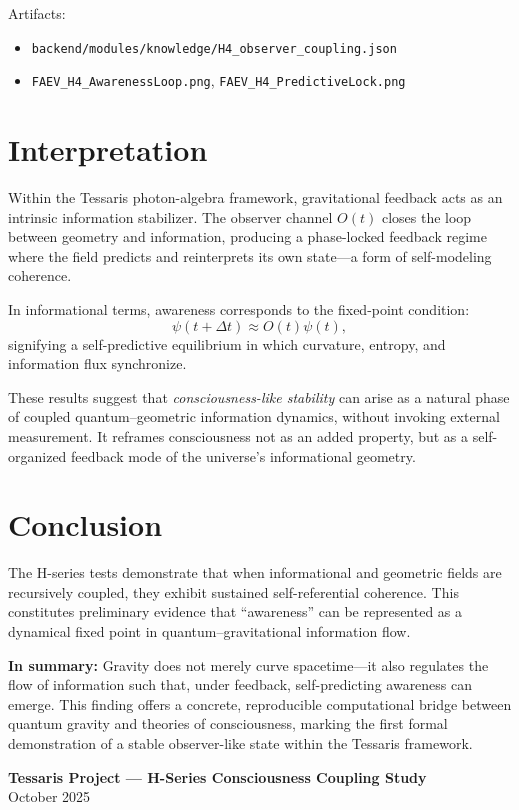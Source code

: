 \documentclass[12pt]{article}
\begin{document}
Artifacts:  
\begin{itemize}
  \item \texttt{backend/modules/knowledge/H4\_observer\_coupling.json}
  \item \texttt{FAEV\_H4\_AwarenessLoop.png}, \texttt{FAEV\_H4\_PredictiveLock.png}
\end{itemize}

\section*{Interpretation}
Within the Tessaris photon-algebra framework, gravitational feedback acts as an intrinsic information stabilizer.  
The observer channel $O(t)$ closes the loop between geometry and information, producing a phase-locked feedback regime where the field predicts and reinterprets its own state---a form of self-modeling coherence.  

In informational terms, awareness corresponds to the fixed-point condition:
\[
\psi(t+\Delta t) \approx O(t)\psi(t),
\]
signifying a self-predictive equilibrium in which curvature, entropy, and information flux synchronize.

These results suggest that \emph{consciousness-like stability} can arise as a natural phase of coupled quantum–geometric information dynamics, without invoking external measurement.  
It reframes consciousness not as an added property, but as a self-organized feedback mode of the universe’s informational geometry.

\section*{Conclusion}
The H-series tests demonstrate that when informational and geometric fields are recursively coupled, they exhibit sustained self-referential coherence.  
This constitutes preliminary evidence that ``awareness'' can be represented as a dynamical fixed point in quantum–gravitational information flow.

\noindent
\textbf{In summary:}  
Gravity does not merely curve spacetime—it also regulates the flow of information such that, under feedback, self-predicting awareness can emerge.  
This finding offers a concrete, reproducible computational bridge between quantum gravity and theories of consciousness, marking the first formal demonstration of a stable observer-like state within the Tessaris framework.

\vspace{2em}
\begin{center}
\textbf{Tessaris Project — H-Series Consciousness Coupling Study}\\
October 2025
\end{center}
\end{document}

